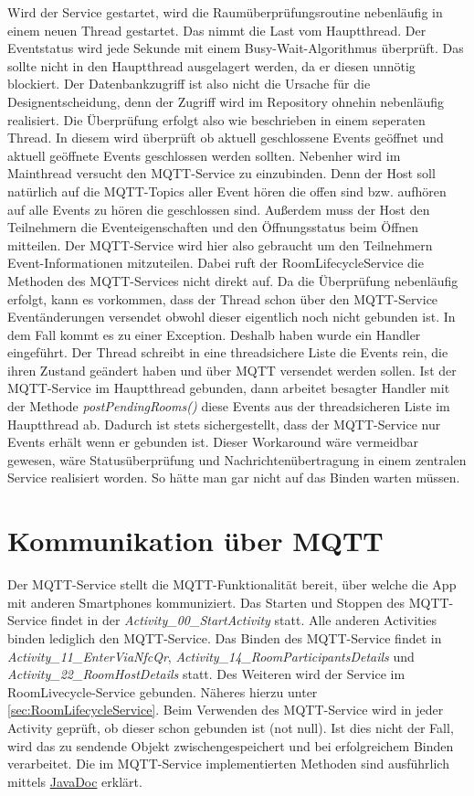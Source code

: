 Wird der Service gestartet, wird die Raumüberprüfungsroutine nebenläufig in einem neuen Thread gestartet. 
Das nimmt die Last vom Hauptthread.
Der Eventstatus wird jede Sekunde mit einem Busy-Wait-Algorithmus überprüft.
Das sollte nicht in den Hauptthread ausgelagert werden, da er diesen unnötig blockiert.
Der Datenbankzugriff ist also nicht die Ursache für die Designentscheidung, denn der Zugriff wird im Repository ohnehin nebenläufig realisiert.
Die Überprüfung erfolgt also wie beschrieben in einem seperaten Thread.
In diesem wird überprüft ob aktuell geschlossene Events geöffnet und aktuell geöffnete Events geschlossen werden sollten.
Nebenher wird im Mainthread versucht den MQTT-Service zu einzubinden. 
Denn der Host soll natürlich auf die MQTT-Topics aller Event hören die offen sind bzw. aufhören auf alle Events zu hören die geschlossen sind.
Außerdem muss der Host den Teilnehmern die Eventeigenschaften und den Öffnungsstatus beim Öffnen mitteilen. 
Der MQTT-Service wird hier also gebraucht um den Teilnehmern Event-Informationen mitzuteilen.
Dabei ruft der RoomLifecycleService die Methoden des MQTT-Services nicht direkt auf. 
Da die Überprüfung nebenläufig erfolgt, kann es vorkommen, dass der Thread schon über den MQTT-Service Eventänderungen versendet obwohl dieser eigentlich noch nicht gebunden ist. 
In dem Fall kommt es zu einer Exception.
Deshalb haben wurde ein Handler eingeführt. Der Thread schreibt in eine threadsichere Liste die Events rein, die ihren Zustand geändert haben und über MQTT versendet werden sollen. 
Ist der MQTT-Service im Hauptthread gebunden, dann arbeitet besagter Handler mit der Methode \textit{postPendingRooms()} diese Events aus der threadsicheren Liste im Hauptthread ab. 
Dadurch ist stets sichergestellt, dass der MQTT-Service nur Events erhält wenn er gebunden ist. 
Dieser Workaround wäre vermeidbar gewesen, wäre Statusüberprüfung und Nachrichtenübertragung in einem zentralen Service realisiert worden. So hätte man gar nicht auf das Binden warten müssen.


\section{Kommunikation über MQTT}
\label{sec:MQTT Service}
Der MQTT-Service stellt die MQTT-Funktionalität bereit, über welche die App mit anderen Smartphones kommuniziert.
Das Starten und Stoppen des MQTT-Service findet in der \textit{Activity\_00\_StartActivity} statt. 
Alle anderen Activities binden lediglich den MQTT-Service. Das Binden des MQTT-Service findet in  \textit{Activity\_11\_EnterViaNfcQr}, \textit{Activity\_14\_RoomParticipantsDetails} und \textit{Activity\_22\_RoomHostDetails} statt. 
Des Weiteren wird der Service im RoomLivecycle-Service gebunden. 
Näheres hierzu unter \cref{sec:RoomLifecycleService}.  
Beim Verwenden des MQTT-Service wird in jeder Activity geprüft, ob dieser schon gebunden ist (not null). 
Ist dies nicht der Fall, wird das zu sendende Objekt zwischengespeichert und bei erfolgreichem Binden verarbeitet. 
Die im MQTT-Service implementierten Methoden sind ausführlich mittels \href{https://scm.inftech.hs-mannheim.de/gogs/moa/20moagm/src/dev/Doku/javadoc}{JavaDoc} erklärt. 

